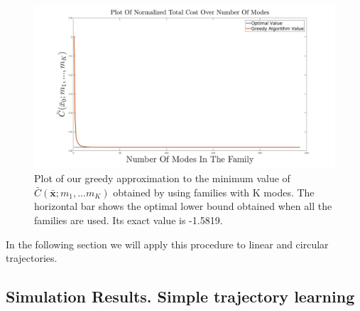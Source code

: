 \documentclass[12,twoside]{TFG-GM}
\theoremstyle{definition}
\theoremstyle{remark}
\newcommand*\diff[1]{\bar{#1}}
\begin{document}
\begin{figure}[htb!]
\begin{center}
\includegraphics[width=16cm]{cost_greedy_over_modes.jpg}
\caption{\label{fig:cost_greedy_over_modes} \small Plot of our greedy approximation to the minimum value of $\diff{C}(\diff{\textbf{x}}; m_1, ... m_K)$ obtained by using families with K modes. The horizontal bar shows the optimal lower bound obtained when all the families are used. Its exact value is -1.5819.}
\end{center}
\end{figure}

In the following section we will apply this procedure to linear and circular trajectories.

\subsection{Simulation Results. Simple trajectory learning}
\label{subsec:learningsimple}
\end{document}
